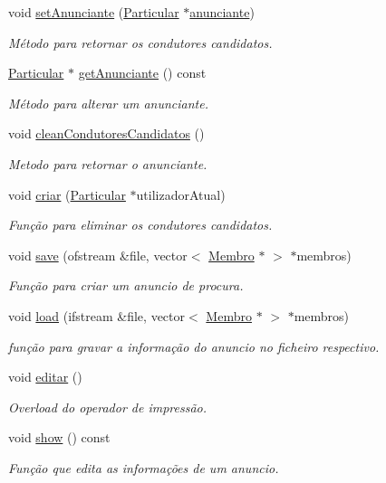 \begin{DoxyCompactItemize}
void \hyperlink{class_anuncio_procura_a303be648c388693e6b92e6bf467c06ff}{set\+Anunciante} (\hyperlink{class_particular}{Particular} $\ast$\hyperlink{class_anuncio_a58250bfc8ab82d4308839b1e26213a0f}{anunciante})
\begin{DoxyCompactList}\small\item\em Método para retornar os condutores candidatos. \end{DoxyCompactList}\item 
\hyperlink{class_particular}{Particular} $\ast$ \hyperlink{class_anuncio_procura_aadc1d2f42fd3a9629498065b931e9134}{get\+Anunciante} () const 
\begin{DoxyCompactList}\small\item\em Método para alterar um anunciante. \end{DoxyCompactList}\item 
void \hyperlink{class_anuncio_procura_a7258f159f42bb53a3d7fe96f34e04280}{clean\+Condutores\+Candidatos} ()
\begin{DoxyCompactList}\small\item\em Metodo para retornar o anunciante. \end{DoxyCompactList}\item 
void \hyperlink{class_anuncio_procura_a222f513534812e754a16e6442bfc8770}{criar} (\hyperlink{class_particular}{Particular} $\ast$utilizador\+Atual)
\begin{DoxyCompactList}\small\item\em Função para eliminar os condutores candidatos. \end{DoxyCompactList}\item 
void \hyperlink{class_anuncio_procura_a3e41646018004c3efb37c9dab3482c96}{save} (ofstream \&file, vector$<$ \hyperlink{class_membro}{Membro} $\ast$ $>$ $\ast$membros)
\begin{DoxyCompactList}\small\item\em Função para criar um anuncio de procura. \end{DoxyCompactList}\item 
void \hyperlink{class_anuncio_procura_a9983a05725bcdcee8aee8f778c79920b}{load} (ifstream \&file, vector$<$ \hyperlink{class_membro}{Membro} $\ast$ $>$ $\ast$membros)
\begin{DoxyCompactList}\small\item\em função para gravar a informação do anuncio no ficheiro respectivo. \end{DoxyCompactList}\item 
void \hyperlink{class_anuncio_procura_ae7ef0a393b385df69d7ee4d22a10e4ec}{editar} ()
\begin{DoxyCompactList}\small\item\em Overload do operador de impressão. \end{DoxyCompactList}\item 
void \hyperlink{class_anuncio_procura_a7a9ac26488642a35643f5322acf40788}{show} () const 
\begin{DoxyCompactList}\small\item\em Função que edita as informações de um anuncio. \end{DoxyCompactList}\end{DoxyCompactItemize}
